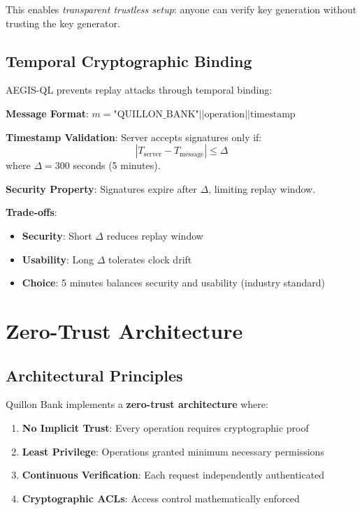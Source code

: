 \documentclass[11pt,a4paper]{article}
\begin{document}
This enables \textit{transparent trustless setup}: anyone can verify key generation without trusting the key generator.

\subsection{Temporal Cryptographic Binding}

AEGIS-QL prevents replay attacks through temporal binding:

\begin{tcolorbox}[colback=qnkblue!5,colframe=qnkblue,title=Temporal Binding Protocol]
\textbf{Message Format}: $m = \text{"QUILLON\_BANK"} || \text{operation} || \text{timestamp}$

\textbf{Timestamp Validation}: Server accepts signatures only if:
$$|T_{\text{server}} - T_{\text{message}}| \leq \Delta$$
where $\Delta = 300$ seconds (5 minutes).

\textbf{Security Property}: Signatures expire after $\Delta$, limiting replay window.
\end{tcolorbox}

\textbf{Trade-offs}:
\begin{itemize}
    \item \textbf{Security}: Short $\Delta$ reduces replay window
    \item \textbf{Usability}: Long $\Delta$ tolerates clock drift
    \item \textbf{Choice}: 5 minutes balances security and usability (industry standard)
\end{itemize}

\section{Zero-Trust Architecture}

\subsection{Architectural Principles}

Quillon Bank implements a \textbf{zero-trust architecture} where:

\begin{enumerate}[leftmargin=*]
    \item \textbf{No Implicit Trust}: Every operation requires cryptographic proof
    \item \textbf{Least Privilege}: Operations granted minimum necessary permissions
    \item \textbf{Continuous Verification}: Each request independently authenticated
    \item \textbf{Cryptographic ACLs}: Access control mathematically enforced
\end{enumerate}
\end{document}
